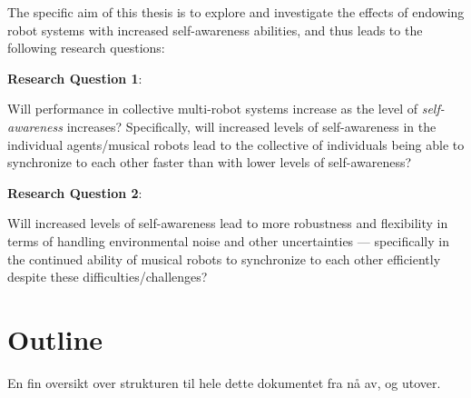 




The specific aim of this thesis is to explore and investigate the effects of endowing robot systems with increased self-awareness abilities, and thus leads to the following research questions: \nl




\textbf{Research Question 1}:

Will performance in collective multi-robot systems increase as the level of \textit{self-awareness} increases? Specifically, will increased levels of self-awareness in the individual agents/musical robots lead to the collective of individuals being able to synchronize to each other faster than with lower levels of self-awareness? \nl

\textbf{Research Question 2}:

Will increased levels of self-awareness lead to more robustness and flexibility in terms of handling environmental noise and other uncertainties — specifically in the continued ability of musical robots to synchronize to each other efficiently despite these difficulties/challenges? \nl




\section{Outline}
En fin  oversikt over strukturen til hele dette dokumentet fra nå av, og utover.




